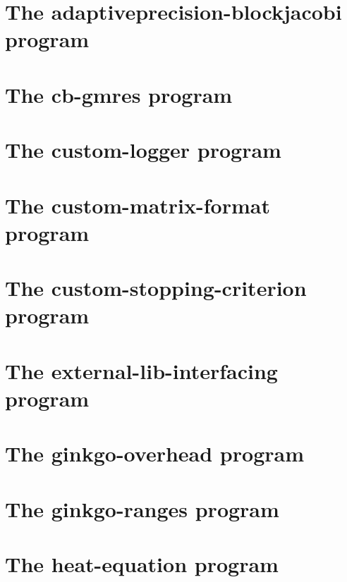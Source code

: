 \let\mypdfximage\pdfximage\def\pdfximage{\immediate\mypdfximage}\documentclass[twoside]{book}
\newcommand{\+}{\discretionary{\mbox{\scriptsize$\hookleftarrow$}}{}{}}
\begin{document}
\chapter{The adaptiveprecision-\/blockjacobi program}
\label{adaptiveprecision_blockjacobi}

\chapter{The cb-\/gmres program}
\label{cb_gmres}

\chapter{The custom-\/logger program}
\label{custom_logger}

\chapter{The custom-\/matrix-\/format program}
\label{custom_matrix_format}

\chapter{The custom-\/stopping-\/criterion program}
\label{custom_stopping_criterion}

\chapter{The external-\/lib-\/interfacing program}
\label{external_lib_interfacing}

\chapter{The ginkgo-\/overhead program}
\label{ginkgo_overhead}

\chapter{The ginkgo-\/ranges program}
\label{ginkgo_ranges}

\chapter{The heat-\/equation program}
\label{heat_equation}

\end{document}
